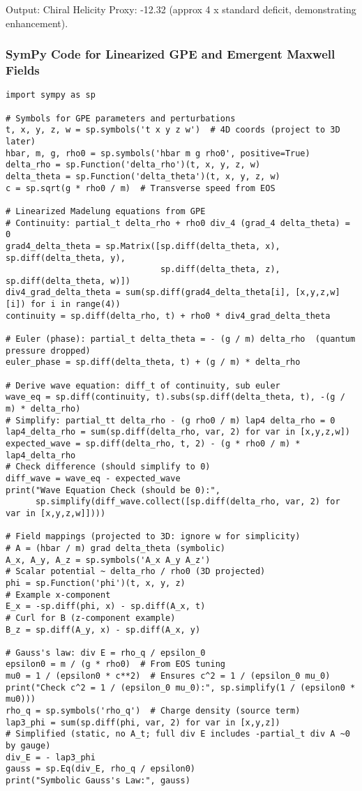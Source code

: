 \documentclass{article}
\begin{document}
Output: Chiral Helicity Proxy: -12.32 (approx 4 x standard deficit, demonstrating enhancement).

\subsubsection{SymPy Code for Linearized GPE and Emergent Maxwell Fields}

\begin{verbatim}
import sympy as sp

# Symbols for GPE parameters and perturbations
t, x, y, z, w = sp.symbols('t x y z w')  # 4D coords (project to 3D later)
hbar, m, g, rho0 = sp.symbols('hbar m g rho0', positive=True)
delta_rho = sp.Function('delta_rho')(t, x, y, z, w)
delta_theta = sp.Function('delta_theta')(t, x, y, z, w)
c = sp.sqrt(g * rho0 / m)  # Transverse speed from EOS

# Linearized Madelung equations from GPE
# Continuity: partial_t delta_rho + rho0 div_4 (grad_4 delta_theta) = 0
grad4_delta_theta = sp.Matrix([sp.diff(delta_theta, x), sp.diff(delta_theta, y),
                               sp.diff(delta_theta, z), sp.diff(delta_theta, w)])
div4_grad_delta_theta = sum(sp.diff(grad4_delta_theta[i], [x,y,z,w][i]) for i in range(4))
continuity = sp.diff(delta_rho, t) + rho0 * div4_grad_delta_theta

# Euler (phase): partial_t delta_theta = - (g / m) delta_rho  (quantum pressure dropped)
euler_phase = sp.diff(delta_theta, t) + (g / m) * delta_rho

# Derive wave equation: diff_t of continuity, sub euler
wave_eq = sp.diff(continuity, t).subs(sp.diff(delta_theta, t), -(g / m) * delta_rho)
# Simplify: partial_tt delta_rho - (g rho0 / m) lap4 delta_rho = 0
lap4_delta_rho = sum(sp.diff(delta_rho, var, 2) for var in [x,y,z,w])
expected_wave = sp.diff(delta_rho, t, 2) - (g * rho0 / m) * lap4_delta_rho
# Check difference (should simplify to 0)
diff_wave = wave_eq - expected_wave
print("Wave Equation Check (should be 0):",
      sp.simplify(diff_wave.collect([sp.diff(delta_rho, var, 2) for var in [x,y,z,w]])))

# Field mappings (projected to 3D: ignore w for simplicity)
# A = (hbar / m) grad delta_theta (symbolic)
A_x, A_y, A_z = sp.symbols('A_x A_y A_z')
# Scalar potential ~ delta_rho / rho0 (3D projected)
phi = sp.Function('phi')(t, x, y, z)
# Example x-component
E_x = -sp.diff(phi, x) - sp.diff(A_x, t)
# Curl for B (z-component example)
B_z = sp.diff(A_y, x) - sp.diff(A_x, y)

# Gauss's law: div E = rho_q / epsilon_0
epsilon0 = m / (g * rho0)  # From EOS tuning
mu0 = 1 / (epsilon0 * c**2)  # Ensures c^2 = 1 / (epsilon_0 mu_0)
print("Check c^2 = 1 / (epsilon_0 mu_0):", sp.simplify(1 / (epsilon0 * mu0)))
rho_q = sp.symbols('rho_q')  # Charge density (source term)
lap3_phi = sum(sp.diff(phi, var, 2) for var in [x,y,z])
# Simplified (static, no A_t; full div E includes -partial_t div A ~0 by gauge)
div_E = - lap3_phi
gauss = sp.Eq(div_E, rho_q / epsilon0)
print("Symbolic Gauss's Law:", gauss)
\end{verbatim}
\end{document}
